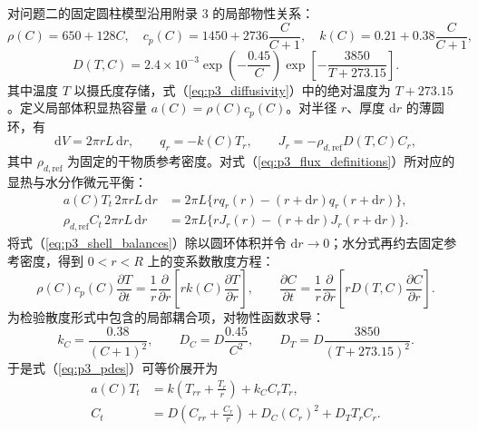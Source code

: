 \documentclass[withoutpreface,bwprint]{cumcmthesis}
\begin{document}
对问题二的固定圆柱模型沿用附录 3 的局部物性关系：
\begin{equation}
\rho(C)=650+128C,\quad c_p(C)=1450+2736\frac{C}{C+1},\quad
k(C)=0.21+0.38\frac{C}{C+1},
\label{eq:p3_thermal_property}
\end{equation}
\begin{equation}
D(T,C)=2.4\times10^{-3}\exp\left(-\frac{0.45}{C}\right)
\exp\left[-\frac{3850}{T+273.15}\right].
\label{eq:p3_diffusivity}
\end{equation}
其中温度 $T$ 以摄氏度存储，式（\ref{eq:p3_diffusivity}）中的绝对温度为 $T+273.15$。定义局部体积显热容量 $a(C)=\rho(C)c_p(C)$。对半径 $r$、厚度 $\mathrm dr$ 的薄圆环，有
\begin{equation}
\mathrm dV=2\pi rL\,\mathrm dr,\qquad
q_r=-k(C)T_r,\qquad
J_r=-\rho_{d,\mathrm{ref}}D(T,C)C_r,
\label{eq:p3_flux_definitions}
\end{equation}
其中 $\rho_{d,\mathrm{ref}}$ 为固定的干物质参考密度。对式（\ref{eq:p3_flux_definitions}）所对应的显热与水分作微元平衡：
\begin{equation}
\begin{aligned}
a(C)T_t\,2\pi rL\,\mathrm dr
&=2\pi L\{rq_r(r)-(r+\mathrm dr)q_r(r+\mathrm dr)\},\\
\rho_{d,\mathrm{ref}}C_t\,2\pi rL\,\mathrm dr
&=2\pi L\{rJ_r(r)-(r+\mathrm dr)J_r(r+\mathrm dr)\}.
\end{aligned}
\label{eq:p3_shell_balances}
\end{equation}
将式（\ref{eq:p3_shell_balances}）除以圆环体积并令 $\mathrm dr\to0$；水分式再约去固定参考密度，得到 $0<r<R$ 上的变系数散度方程：
\begin{equation}
\rho(C)c_p(C)\frac{\partial T}{\partial t}
=\frac{1}{r}\frac{\partial}{\partial r}\left[rk(C)\frac{\partial T}{\partial r}\right],\qquad
\frac{\partial C}{\partial t}
=\frac{1}{r}\frac{\partial}{\partial r}\left[rD(T,C)\frac{\partial C}{\partial r}\right].
\label{eq:p3_pdes}
\end{equation}
为检验散度形式中包含的局部耦合项，对物性函数求导：
\begin{equation}
k_C=\frac{0.38}{(C+1)^2},\qquad
D_C=D\frac{0.45}{C^2},\qquad
D_T=D\frac{3850}{(T+273.15)^2}.
\label{eq:p3_coefficient_derivatives}
\end{equation}
于是式（\ref{eq:p3_pdes}）可等价展开为
\begin{equation}
\begin{aligned}
a(C)T_t&=k\left(T_{rr}+\frac{T_r}{r}\right)+k_CC_rT_r,\\
C_t&=D\left(C_{rr}+\frac{C_r}{r}\right)+D_C(C_r)^2+D_TT_rC_r.
\end{aligned}
\label{eq:p3_expanded_pdes}
\end{equation}
\end{document}
